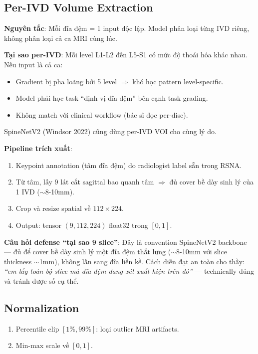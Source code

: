 \documentclass[11pt,a4paper]{article}
\begin{document}
\subsection{Per-IVD Volume Extraction}

\noindent\textbf{Nguyên tắc}: Mỗi đĩa đệm = 1 input độc lập. Model phân
loại từng IVD riêng, không phân loại cả ca MRI cùng lúc.

\noindent\textbf{Tại sao per-IVD}: Mỗi level L1-L2 đến L5-S1 có mức độ
thoái hóa khác nhau. Nếu input là cả ca:
\begin{itemize}[leftmargin=*]
\item Gradient bị pha loãng bởi 5 level $\Rightarrow$ khó học pattern
level-specific.
\item Model phải học task ``định vị đĩa đệm'' bên cạnh task grading.
\item Không match với clinical workflow (bác sĩ đọc per-disc).
\end{itemize}
SpineNetV2 (Windsor 2022) cũng dùng per-IVD VOI cho cùng lý do.

\noindent\textbf{Pipeline trích xuất}:
\begin{enumerate}[leftmargin=*]
\item Keypoint annotation (tâm đĩa đệm) do radiologist label sẵn trong RSNA.
\item Từ tâm, lấy 9 lát cắt sagittal bao quanh tâm $\Rightarrow$ đủ
cover bề dày sinh lý của 1 IVD ($\sim$8-10mm).
\item Crop và resize spatial về $112 \times 224$.
\item Output: tensor $(9, 112, 224)$ float32 trong $[0, 1]$.
\end{enumerate}

\noindent\textbf{Câu hỏi defense ``tại sao 9 slice''}: Đây là convention
SpineNetV2 backbone --- đủ để cover bề dày sinh lý một đĩa đệm thắt
lưng ($\sim$8-10mm với slice thickness $\sim$1mm), không lấn sang đĩa
liền kề. Cách diễn đạt an toàn cho thầy: \emph{``em lấy toàn bộ slice
mà đĩa đệm đang xét xuất hiện trên đó''} --- technically đúng và tránh
được số cụ thể.

\subsection{Normalization}

\begin{enumerate}[leftmargin=*]
\item Percentile clip $[1\%, 99\%]$: loại outlier MRI artifacts.
\item Min-max scale về $[0, 1]$.
\end{enumerate}
\end{document}
